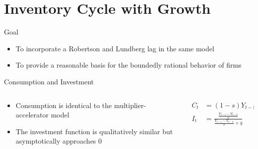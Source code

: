 \documentclass{beamer}
\begin{document}

\section*{Inventory Cycle with Growth}
\begin{frame}{Goal}
	\begin{itemize}
		\item To incorporate a Robertson and Lundberg lag in the same model
		\item To provide a reasonable basis for the boundedly rational behavior of firms
	\end{itemize}
\end{frame}

\begin{frame}{Consumption and Investment}
	\begin{columns}
	\begin{column}{0.5\textwidth}
		\begin{itemize}
			\item Consumption is identical to the multiplier-accelerator model
			\item The investment function is qualitatively similar but asymptotically approaches 0
		\end{itemize}
	\end{column}
	\begin{column}{0.5\textwidth}
		\begin{align*}
			C_t &= (1-s)Y_{t-1}+sY_{t-2}\\
			I_t &= \frac{\frac{Y_{t-1}-Y_{t-2}}{v}}{\frac{Y_{t-1}-Y_{t-2}}{v}+q}
		\end{align*}
	\end{column}
	\end{columns}
\end{frame}
\end{document}

